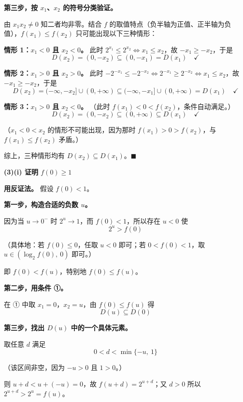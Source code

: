 \begin{answer}
\textbf{第三步，按 $x_1$、$x_2$ 的符号分类验证。}

由 $x_1x_2\ne0$ 知二者均非零。结合 $f$ 的取值特点（负半轴为正值、正半轴为负值），$f(x_1)\le f(x_2)$ 只可能出现以下三种情形：

\textbf{情形 1：$x_1<0$ 且 $x_2<0$。}
此时 $2^{x_1}\le2^{x_2}\iff x_1\le x_2$，故 $-x_1\ge-x_2$，于是
\nopagebreak[4]
\[D(x_2)=(0,-x_2)\subseteq(0,-x_1)=D(x_1)\quad\checkmark\]

\textbf{情形 2：$x_1>0$ 且 $x_2>0$。}
此时 $-2^{-x_1}\le-2^{-x_2}\iff 2^{-x_1}\ge2^{-x_2}\iff x_1\le x_2$，故 $-x_1\ge-x_2$，于是
\nopagebreak[4]
\[D(x_2)=(-\infty,-x_2]\cup(0,+\infty)\subseteq(-\infty,-x_1]\cup(0,+\infty)=D(x_1)\quad\checkmark\]

\textbf{情形 3：$x_1>0$ 且 $x_2<0$。}
（此时 $f(x_1)<0<f(x_2)$，条件自动满足。）
\nopagebreak[4]
\[D(x_2)=(0,-x_2)\subseteq(0,+\infty)\subseteq D(x_1)\quad\checkmark\]

（$x_1<0<x_2$ 的情形不可能出现，因为那时 $f(x_1)>0>f(x_2)$，与 $f(x_1)\le f(x_2)$ 矛盾。）

综上，三种情形均有 $D(x_2)\subseteq D(x_1)$。$\blacksquare$

\par\medskip

\textbf{(3)(i) 证明 $f(0)\ge1$}

\textbf{用反证法。} 假设 $f(0)<1$。

\textbf{第一步，构造合适的负数 $u$。}

因为当 $u\to0^{-}$ 时 $2^{u}\to1$，而 $f(0)<1$，所以存在 $u<0$ 使
\nopagebreak[4]
\[2^{u}>f(0)\]

（具体地：若 $f(0)\le0$，任取 $u<0$ 即可；若 $0<f(0)<1$，取 $u\in\left(\log_2 f(0),\ 0\right)$ 即可。）

即 $f(0)<f(u)$，特别地 $f(0)\le f(u)$。

\textbf{第二步，用条件 ①。}

在 ① 中取 $x_1=0$，$x_2=u$，由 $f(0)\le f(u)$ 得
\nopagebreak[4]
\[D(u)\subseteq D(0)\]

\textbf{第三步，找出 $D(u)$ 中的一个具体元素。}

取任意 $d$ 满足
\nopagebreak[4]
\[0<d<\min\{-u,\ 1\}\]

（该区间非空，因为 $-u>0$ 且 $1>0$。）

则 $u+d<u+(-u)=0$，故 $f(u+d)=2^{u+d}$；又 $d>0$ 所以 $2^{u+d}>2^{u}=f(u)$。


\end{answer}
